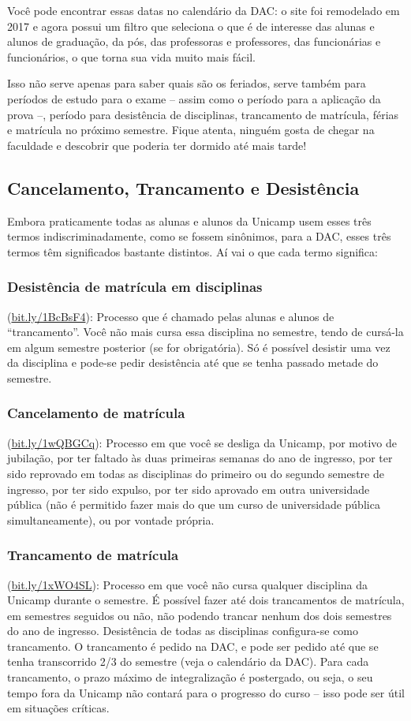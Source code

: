 Você pode encontrar essas datas no calendário da DAC: o site foi remodelado em
2017 e agora possui um filtro que seleciona o que é de interesse das alunas e
alunos de graduação, da pós, das professoras e professores, das funcionárias e
funcionários, o que torna sua vida muito mais fácil.

Isso não serve apenas para saber quais são os feriados, serve também para
períodos de estudo para o exame -- assim como o período para a aplicação da
prova --, período para desistência de disciplinas, trancamento de matrícula,
férias e matrícula no próximo semestre. Fique atenta, ninguém gosta de chegar
na faculdade e descobrir que poderia ter dormido até mais tarde!

\subsection{Cancelamento, Trancamento e Desistência}

Embora praticamente todas as alunas e alunos da Unicamp usem esses três termos
indiscriminadamente, como se fossem sinônimos, para a DAC, esses três termos
têm significados bastante distintos. Aí vai o que cada termo significa:

\subsubsection{Desistência de matrícula em disciplinas} (\url{bit.ly/1BcBsF4}):
Processo que é chamado pelas alunas e alunos de ``trancamento''. Você não mais
cursa essa disciplina no semestre, tendo de cursá-la em algum semestre
posterior (se for obrigatória). Só é possível desistir uma vez da disciplina e
pode-se pedir desistência até que se tenha passado metade do semestre.
\subsubsection{Cancelamento de matrícula} (\url{bit.ly/1wQBGCq}): Processo em
que você se desliga da Unicamp, por motivo de jubilação, por ter faltado às
duas primeiras semanas do ano de ingresso, por ter sido reprovado em todas as
disciplinas do primeiro ou do segundo semestre de ingresso, por ter sido
expulso, por ter sido aprovado em outra universidade pública (não é permitido
fazer mais do que um curso de universidade pública simultaneamente), ou por
vontade própria.
\subsubsection{Trancamento de matrícula} (\url{bit.ly/1xWO4SL}): Processo em
que você não cursa qualquer disciplina da Unicamp durante o semestre. É
possível fazer até dois trancamentos de matrícula, em semestres seguidos ou
não, não podendo trancar nenhum dos dois semestres do ano de ingresso.
Desistência de todas as disciplinas configura-se como trancamento. O
trancamento é pedido na DAC, e pode ser pedido até que se tenha transcorrido
2/3 do semestre (veja o calendário da DAC). Para cada trancamento, o prazo
máximo de integralização é postergado, ou seja, o seu tempo fora da Unicamp não
contará para o progresso do curso -- isso pode ser útil em situações críticas.

